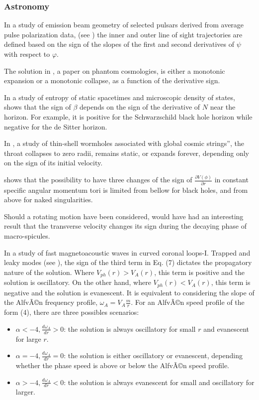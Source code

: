 \documentclass[11pt]{book}
\begin{document}

\subsubsection{Astronomy}


In a study of emission beam geometry of selected pulsars derived from
average pulse polarization data, (see \cite{everett2001emission}) the inner and outer line of sight trajectories are defined based on the sign of the slopes of the first and second
derivatives of $\psi$ with respect to $\varphi$.

The solution in \cite{dabrowski2003phantom}, a paper on phantom cosmologies, is either a monotonic
expansion or a monotonic collapse, as a function of the derivative
sign.

In a study of entropy of static spacetimes and microscopic density of states, \cite{padmanabhan2004entropy} shows that the sign of $\beta$ depends on
the sign of the derivative of $N$ near the horizon. For example,
it is positive for the Schwarzschild black hole horizon while negative
for the de Sitter horizon.

In \cite{eiroa2004cylindrical}, a study of thin-shell wormholes associated
with global cosmic strings”, the throat collapses to zero radii,
remains static, or expands forever, depending only on the sign of
its initial velocity.

\cite{stuchlik2005aschenbach} shows that the possibility to have three changes of the sign of $\frac{\partial V\left(\phi\right)}{\partial r}$
in constant specific angular momentum tori is limited from bellow for black holes, and from above for naked singularities.

Should a rotating motion have been considered, \cite{xia2005time}
would have had an interesting result that the transverse velocity
changes its sign during the decaying phase of macro-spicules.

In a study of fast magnetoacoustic waves in curved
coronal loops-I. Trapped and leaky modes (see \cite{verwichte2006fast}), the sign of the third term in Eq. (7)
dictates the propagatory nature of the solution. Where $V_{ph}\left(r\right)>V_{A}\left(r\right)$,
this term is positive and the solution is oscillatory. On the other
hand, where $V_{ph}\left(r\right)<V_{A}\left(r\right)$, this term
is negative and the solution is evanescent. It is equivalent to considering
the slope of the AlfvÃ©n frequency profile, $\omega_{A}=V_{A}\frac{m}{r}$.
For an AlfvÃ©n speed profile of the form (4), there are three possibles scenarios:
\begin{itemize}
\item $\alpha<-4,\frac{d\omega_{A}}{dr}>0$: the solution is always oscillatory
for small $r$ and evanescent for large $r$.

\item$\alpha=-4,\frac{d\omega_{A}}{dr}=0$: the solution is either oscillatory
or evanescent, depending whether the phase speed is above or below
the AlfvÃ©n speed profile.

\item $\alpha>-4,\frac{d\omega_{A}}{dr}<0$: the solution is always evanescent
for small and oscillatory for larger.
\end{itemize}
\end{document}
